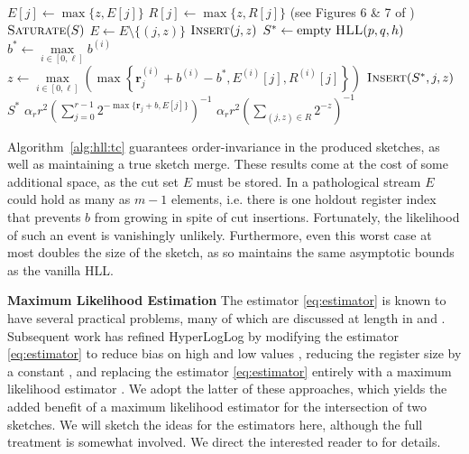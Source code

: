\documentclass{report}
\newcommand{\algoname}[1]{\textnormal{\textsc{#1}}}
\begin{document}
\begin{algorithm}[htbp]
\begin{algorithmic}[1]
				\State $E[j] \gets \max \{z, E[j]\}$
			\EndIf
		\ElsIf {$\nu = \algoname{sparse}$}
			\State $R[j] \gets \max \{z, R[j]\}$ (see Figures 6 \& 7 of \cite{heule2013hyperloglog})
				\State $\algoname{Saturate}(S)$
			\EndIf
		\EndIf
	\EndFunction
%
			\State $E \gets E \setminus \{(j, z)\}$
			\State $\algoname{Insert}(j, z)$
		\EndFor
	\EndFunction
%
%
		\State $S^* \gets \text{empty $\algoname{HLL}(p, q, h)$}$
		\For{$j \in [0,r)$} 
			\State $b^* \gets \max\limits_{i \in [0, \ell]} b^{(i)}$
			\State $z \gets  \max\limits_{ i \in [0, \ell]} \left ( \max \left \{ \mathbf{r}^{(i)}_j + b^{(i)} - b^{*}, E^{(i)}[j], R^{(i)}[j] \right \} \right )$
				\State $\algoname{Insert}(S^*, j, z)$
			\EndIf
		\EndFor
		\State \Return $S^*$
	\EndFunction
%
		\If{$\nu = \algoname{dense}$}
			\State \Return $\alpha_r r^2 \left ( \sum\limits_{j=0}^{r-1} 2^{-\max \{ \mathbf{r}_j + b, E[j]\}} \right) ^{-1}$
		\Else
			\State \Return $\alpha_r r^2 \left ( \sum\limits_{(j, z) \in R} 2^{-z} \right) ^{-1}$
		\EndIf
	\EndFunction
\end{algorithmic}
\end{algorithm}


Algorithm~\ref{alg:hll:tc} guarantees order-invariance in the produced sketches, as well as maintaining a true sketch merge.
These results come at the cost of some additional space, as the cut set $E$ must be stored.
In a pathological stream $E$ could hold as many as $m-1$ elements, i.e. there is one holdout register index that prevents $b$ from growing in spite of cut insertions. 
Fortunately, the likelihood of such an event is vanishingly unlikely. 
Furthermore, even this worst case at most doubles the size of the sketch, as so maintains the same asymptotic bounds as the vanilla \algoname{HLL}.


\vspace{1em}
\textbf{Maximum Likelihood Estimation}
The estimator \eqref{eq:estimator} is known to have several practical problems, many of which are discussed at length in \cite{flajolet2007hyperloglog} and \cite{heule2013hyperloglog}.
Subsequent work has refined HyperLogLog by modifying the estimator \eqref{eq:estimator} to reduce bias on high and low values \cite{flajolet2007hyperloglog, heule2013hyperloglog, qin2016loglog},  reducing the register size by a constant \cite{xiao2017better}, and replacing the estimator \eqref{eq:estimator} entirely with a maximum likelihood estimator \cite{xiao2017better, lang2017back, ertl2017new}.
We adopt the latter of these approaches, which yields the added benefit of a maximum likelihood estimator for the intersection of two sketches. 
We will sketch the ideas for the estimators here, although the full treatment is somewhat involved.
We direct the interested reader to \cite{ertl2017new} for details.
\end{document}
